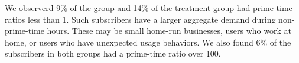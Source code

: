 We observerd 9\% of the \control{} group and 14\% of 
the treatment group had prime-time ratios less than 1. Such subscribers 
have a larger aggregate demand during non-prime-time hours. These
may be small home-run businesses, users who work at home, or 
users who have unexpected usage behaviors. We also found 6\% of the 
subscribers in both groups had a prime-time ratio over 100.
